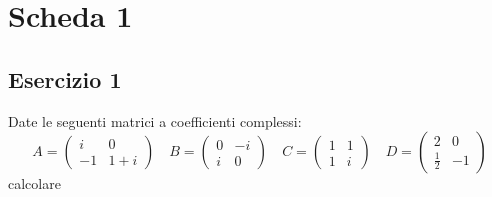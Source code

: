 \documentclass[a4paper]{article}
\theoremstyle{break}
\theoremstyle{break}
\theoremstyle{break}
\theoremstyle{break}
\begin{document}


\tableofcontents
\pagebreak

\section{Scheda 1}
\subsection{Esercizio 1}
Date le seguenti matrici a coefficienti complessi:
\[
	A = \begin{pmatrix}
		i  & 0   \\
		-1 & 1+i
	\end{pmatrix}
	\quad
	B = \begin{pmatrix}
		0 & -i \\
		i & 0
	\end{pmatrix}
	\quad
	C = \begin{pmatrix}
		1 & 1 \\
		1 & i
	\end{pmatrix}
	\quad
	D = \begin{pmatrix}
		2           & 0  \\
		\frac{1}{2} & -1
	\end{pmatrix}
\]
calcolare
\end{document}
